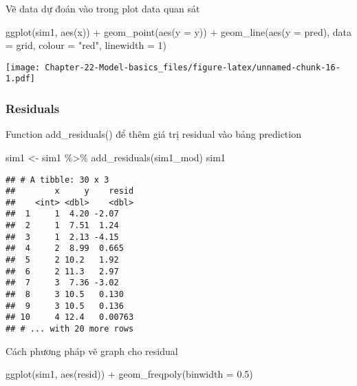 \documentclass[
]{article}
\newenvironment{Shaded}{\begin{snugshade}}{\end{snugshade}}
\newcommand{\AttributeTok}[1]{\textcolor[rgb]{0.77,0.63,0.00}{#1}}
\newcommand{\DecValTok}[1]{\textcolor[rgb]{0.00,0.00,0.81}{#1}}
\newcommand{\FloatTok}[1]{\textcolor[rgb]{0.00,0.00,0.81}{#1}}
\newcommand{\FunctionTok}[1]{\textcolor[rgb]{0.00,0.00,0.00}{#1}}
\newcommand{\NormalTok}[1]{#1}
\newcommand{\OtherTok}[1]{\textcolor[rgb]{0.56,0.35,0.01}{#1}}
\newcommand{\SpecialCharTok}[1]{\textcolor[rgb]{0.00,0.00,0.00}{#1}}
\newcommand{\StringTok}[1]{\textcolor[rgb]{0.31,0.60,0.02}{#1}}
\begin{document}
Vẽ data dự đoán vào trong plot data quan sát

\begin{Shaded}
\begin{Highlighting}[]
\FunctionTok{ggplot}\NormalTok{(sim1, }\FunctionTok{aes}\NormalTok{(x)) }\SpecialCharTok{+}
  \FunctionTok{geom\_point}\NormalTok{(}\FunctionTok{aes}\NormalTok{(}\AttributeTok{y =}\NormalTok{ y)) }\SpecialCharTok{+}
  \FunctionTok{geom\_line}\NormalTok{(}\FunctionTok{aes}\NormalTok{(}\AttributeTok{y =}\NormalTok{ pred), }\AttributeTok{data =}\NormalTok{ grid, }\AttributeTok{colour =} \StringTok{"red"}\NormalTok{, }\AttributeTok{linewidth =} \DecValTok{1}\NormalTok{)}
\end{Highlighting}
\end{Shaded}

\texttt{[image: Chapter-22-Model-basics\_files/figure-latex/unnamed-chunk-16-1.pdf]}

\hypertarget{residuals}{%
\subsubsection{Residuals}\label{residuals}}

Function add\_residuals() để thêm giá trị residual vào bảng prediction

\begin{Shaded}
\begin{Highlighting}[]
\NormalTok{sim1 }\OtherTok{\textless{}{-}}\NormalTok{ sim1 }\SpecialCharTok{\%\textgreater{}\%} 
  \FunctionTok{add\_residuals}\NormalTok{(sim1\_mod)}
\NormalTok{sim1}
\end{Highlighting}
\end{Shaded}

\begin{verbatim}
## # A tibble: 30 x 3
##        x     y    resid
##    <int> <dbl>    <dbl>
##  1     1  4.20 -2.07   
##  2     1  7.51  1.24   
##  3     1  2.13 -4.15   
##  4     2  8.99  0.665  
##  5     2 10.2   1.92   
##  6     2 11.3   2.97   
##  7     3  7.36 -3.02   
##  8     3 10.5   0.130  
##  9     3 10.5   0.136  
## 10     4 12.4   0.00763
## # ... with 20 more rows
\end{verbatim}

Cách phương pháp vẽ graph cho residual

\begin{Shaded}
\begin{Highlighting}[]
\FunctionTok{ggplot}\NormalTok{(sim1, }\FunctionTok{aes}\NormalTok{(resid)) }\SpecialCharTok{+} 
  \FunctionTok{geom\_freqpoly}\NormalTok{(}\AttributeTok{binwidth =} \FloatTok{0.5}\NormalTok{)}
\end{Highlighting}
\end{Shaded}
\end{document}
